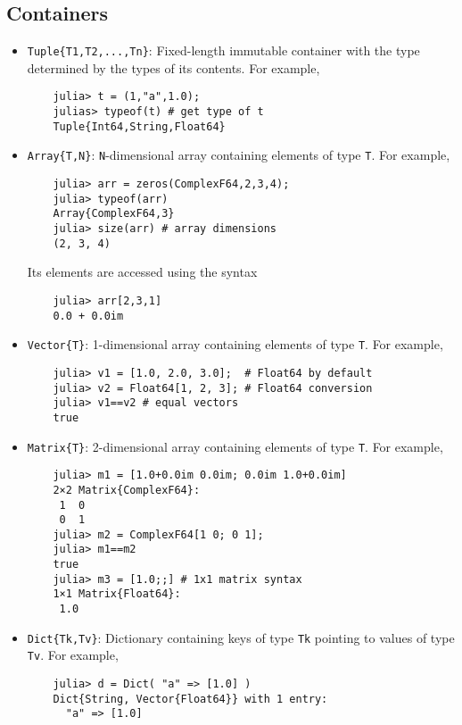 \documentclass[notitlepage]{article}
\begin{document}
\subsection{Containers}
\begin{itemize}
    \item \texttt{Tuple\{T1,T2,...,Tn\}}: 
        Fixed-length immutable container with the type
        determined by the types of its contents. For example, 
\begin{verbatim}
    julia> t = (1,"a",1.0);
    julias> typeof(t) # get type of t
    Tuple{Int64,String,Float64}
\end{verbatim}
    \item \texttt{Array\{T,N\}}: \texttt{N}-dimensional array 
        containing elements of type \texttt{T}. For example, 
\begin{verbatim}
    julia> arr = zeros(ComplexF64,2,3,4);
    julia> typeof(arr)
    Array{ComplexF64,3}
    julia> size(arr) # array dimensions
    (2, 3, 4)
\end{verbatim}
        Its elements are accessed using the syntax
\begin{verbatim}
    julia> arr[2,3,1]
    0.0 + 0.0im
\end{verbatim}
    \item \texttt{Vector\{T\}}: 1-dimensional array containing
        elements of type \texttt{T}. For example,
\begin{verbatim}
    julia> v1 = [1.0, 2.0, 3.0];  # Float64 by default
    julia> v2 = Float64[1, 2, 3]; # Float64 conversion
    julia> v1==v2 # equal vectors
    true
\end{verbatim}
    \item \texttt{Matrix\{T\}}: 2-dimensional array containing
        elements of type \texttt{T}. For example,
\begin{verbatim}
    julia> m1 = [1.0+0.0im 0.0im; 0.0im 1.0+0.0im]
    2×2 Matrix{ComplexF64}:
     1  0
     0  1
    julia> m2 = ComplexF64[1 0; 0 1];
    julia> m1==m2
    true
    julia> m3 = [1.0;;] # 1x1 matrix syntax
    1×1 Matrix{Float64}:
     1.0
\end{verbatim}
    \item \texttt{Dict\{Tk,Tv\}}: Dictionary containing keys
        of type \texttt{Tk} pointing to values of type
        \texttt{Tv}. For example, 
\begin{verbatim}
    julia> d = Dict( "a" => [1.0] )
    Dict{String, Vector{Float64}} with 1 entry:
      "a" => [1.0]
\end{verbatim}
\end{itemize}
\end{document}
